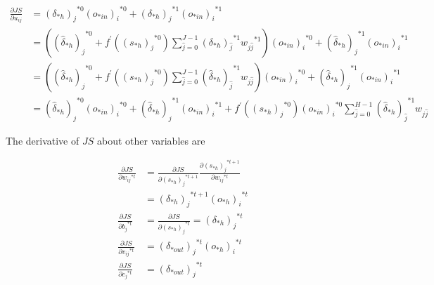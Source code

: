 \documentclass[runningheads,openany]{xhlPaper}
\begin{document}
\begin{equation}
\label{equ:rnn_derivative_equivalent_strategy_2}
\begin{aligned}
\frac{{\partial JS}}{{\partial {u_{ij}}}} &= {\left( {{\delta _{*h}}} \right)_j}^{*0}{\left( {{o_{*in}}} \right)_i}^{*0} + {\left( {{\delta _{*h}}} \right)_j}^{*1}{\left( {{o_{*in}}} \right)_i}^{*1}\\
 &= \left( {{{\left( {{{\hat \delta }_{*h}}} \right)}_j}^{*0} + {f^{'}}\left( {{{\left( {{s_{*h}}} \right)}_j}^{*0}} \right)\sum\limits_{\hat j = 0}^{J - 1} {{{\left( {{\delta _{*h}}} \right)}_{\hat j}}^{*1}} {w_{j\hat j}}^{*1}} \right){\left( {{o_{*in}}} \right)_i}^{*0} + {\left( {{{\hat \delta }_{*h}}} \right)_j}^{*1}{\left( {{o_{*in}}} \right)_i}^{*1}\\
 &= \left( {{{\left( {{{\hat \delta }_{*h}}} \right)}_j}^{*0} + {f^{'}}\left( {{{\left( {{s_{*h}}} \right)}_j}^{*0}} \right)\sum\limits_{\hat j = 0}^{J - 1} {{{\left( {{{\hat \delta }_{*h}}} \right)}_{\hat j}}^{*1}{w_{j\hat j}}} } \right){\left( {{o_{*in}}} \right)_i}^{*0} + {\left( {{{\hat \delta }_{*h}}} \right)_j}^{*1}{\left( {{o_{*in}}} \right)_i}^{*1}\\
 &= {\left( {{{\hat \delta }_{*h}}} \right)_j}^{*0}{\left( {{o_{*in}}} \right)_i}^{*0} + {\left( {{{\hat \delta }_{*h}}} \right)_j}^{*1}{\left( {{o_{*in}}} \right)_i}^{*1} + {f^{'}}\left( {{{\left( {{s_{*h}}} \right)}_j}^{*0}} \right){\left( {{o_{*in}}} \right)_i}^{*0}\sum\limits_{\hat j = 0}^{H - 1} {{{\left( {{{\hat \delta }_{*h}}} \right)}_{\hat j}}^{*1}} {w_{j\hat j}}
\end{aligned}
\end{equation}

The derivative of $JS$ about other variables are 

\begin{equation}
\label{equ:rnn_derivative_other_variables}
\begin{aligned}
\frac{{\partial JS}}{{\partial {w_{ij}}^{*t}}} &= \frac{{\partial JS}}{{\partial {{\left( {{s_{*h}}} \right)}_j}^{*t + 1}}}\frac{{\partial {{\left( {{s_{*h}}} \right)}_j}^{*t + 1}}}{{\partial {w_{ij}}^{*t}}}\\
 &= {\left( {{\delta _{*h}}} \right)_j}^{*t + 1}{\left( {{o_{*h}}} \right)_i}^{*t}\\
\frac{{\partial JS}}{{\partial {b_j}^{*t}}} &= \frac{{\partial JS}}{{\partial {{\left( {{s_{*h}}} \right)}_j}^{*t}}} = {\left( {{\delta _{*h}}} \right)_j}^{*t}\\
\frac{{\partial JS}}{{\partial {v_{ij}}^{*t}}} &= {\left( {{\delta _{*out}}} \right)_j}^{*t}{\left( {{o_{*h}}} \right)_i}^{*t}\\
\frac{{\partial JS}}{{\partial {c_j}^{*t}}} &= {\left( {{\delta _{*out}}} \right)_j}^{*t}
\end{aligned}
\end{equation}
\end{document}
